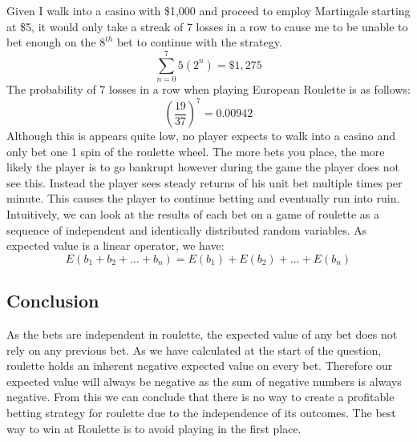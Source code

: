 \documentclass[12pt]{article}
\begin{document}
Given I walk into a casino with \$1,000 and proceed to employ Martingale starting at \$5, it would only take a streak of 7 losses in a row to cause me to be unable to bet enough on the $8^{th}$ bet to continue with the strategy.
$$\sum^{7}_{n=0}5(2^n)=\$1,275$$
The probability of 7 losses in a row when playing European Roulette is as follows:
$$\left(\frac{19}{37}\right)^7=0.00942$$
Although this is appears quite low, no player expects to walk into a casino and only bet one 1 spin of the roulette wheel. The more bets you place, the more likely the player is to go bankrupt however during the game the player does not see this. Instead the player sees steady returns of his unit bet multiple times per minute. This causes the player to continue betting and eventually run into ruin. Intuitively, we can look at the results of each bet on a game of roulette as a sequence of independent and identically distributed random variables. As expected value is a linear operator, we have:
$$E(b_1+b_2+...+b_n)=E(b_1)+E(b_2)+...+E(b_n)$$
\subsection{Conclusion}
As the bets are independent in roulette, the expected value of any bet does not rely on any previous bet. As we have calculated at the start of the question, roulette holds an inherent negative expected value on every bet. Therefore our expected value will always be negative as the sum of negative numbers is always negative. From this we can conclude that there is no way to create a profitable betting strategy for roulette due to the independence of its outcomes. The best way to win at Roulette is to avoid playing in the first place.
\end{document}
